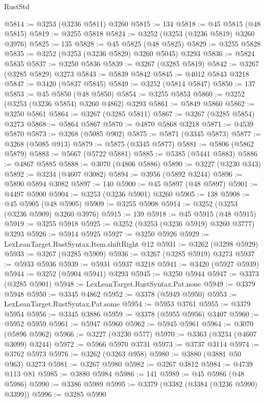 \begin{lexlean}{RustStd}
\begin{coremodule}
{\begin{coremodule}
{{{{{{{{{{{{{{{{{{{{{{{{{{{{{{{{{{{{{{{@5814 := @3253 (@3236 @5811) @3260
@5815 := 134
@5818 := @45 @5815 (@48 @5815)
@5819 := @3255 @5818
@5824 := @3252 (@3253 (@3236 @5819) @3260 @3976)
@5825 := 135
@5828 := @45 @5825 (@48 @5825)
@5829 := @3255 @5828
@5835 := @3252 (@3253 (@3236 @5829) @3260 @5045) @3293
@5836 := @5824 @5835
@5837 := @3250 @5836
@5839 := @3267 (@3285 @5819)
@5842 := @3267 (@3285 @5829) @3273
@5843 := @5839 @5842
@5845 := @4012 @5843 @3218
@5847 := @3420 (@5837 @5845)
@5849 := @3252 (@5814 @5847)
@5850 := 137
@5853 := @45 @5850 (@48 @5850)
@5854 := @3255 @5853
@5860 := @3252 (@3253 (@3236 @5854) @3260 @4862) @3293
@5861 := @5849 @5860
@5862 := @3250 @5861
@5864 := @3267 (@3285 @5811)
@5867 := @3267 (@3285 @5854) @3273
@5868 := @5864 @5867
@5870 := @4870 @5868 @3218
@5871 := @4539 @5870
@5873 := @3268 (@5085 @902)
@5875 := @5871 (@3345 @5873)
@5877 := @3268 (@5085 @913)
@5879 := @5875 (@3345 @5877)
@5881 := @5806 (@5862 @5879)
@5883 := @5667 (@5722 @5881)
@5885 := @5385 (@5441 @5883)
@5886 := @4867 @5885
@5888 := @3070 (@4806 @5886)
@5890 := @3227 (@3230 @343)
@5892 := @3234 (@4607 @3082)
@5894 := @3956 (@5892 @3244)
@5896 := @5890 @5894 @3082
@5897 := 140
@5900 := @45 @5897 (@48 @5897)
@5901 := @4497 @5900
@5904 := @3253 (@3236 @5901) @3260
@5905 := 138
@5908 := @45 @5905 (@48 @5905)
@5909 := @3255 @5908
@5914 := @3252 (@3253 (@3236 @5909) @3260 @3976)
@5915 := 139
@5918 := @45 @5915 (@48 @5915)
@5919 := @3255 @5918
@5925 := @3252 (@3253 (@3236 @5919) @3260 @3777) @3293
@5926 := @5914 @5925
@5927 := @3250 @5926
@5929 := LexLeanTarget.RustSyntax.Item.shiftRight @12
@5931 := @3262 (@3298 @5929)
@5933 := @3267 (@3285 @5909)
@5936 := @3267 (@3285 @5919) @3273
@5937 := @5933 @5936
@5939 := @5931 @5937 @3218
@5941 := @3420 (@5927 @5939)
@5944 := @3252 (@5904 @5941) @3293
@5945 := @3250 @5944
@5947 := @3373 (@3285 @5901)
@5948 := LexLeanTarget.RustSyntax.Pat.none
@5949 := @3379 @5948
@5950 := @3345 @4862
@5952 := @3378 (@5949 @5950)
@5953 := LexLeanTarget.RustSyntax.Pat.some
@5954 := @5953 @3761
@5955 := @3379 @5954
@5956 := @3345 @3886
@5959 := @3378 (@5955 @5956) @3407
@5960 := @5952 @5959
@5961 := @5947 @5960
@5962 := @5945 @5961
@5964 := @3070 (@5896 @5962)
@5966 := @3227 (@3230 @577)
@5970 := @3363 (@3234 (@4607 @3099) @3244)
@5972 := @5966 @5970 @3731
@5973 := @3737 @3114
@5974 := @3762 @5973
@5976 := @3262 (@3263 @958)
@5980 := @3880 (@3881 @50 @963) @3273
@5981 := @3267 @5980
@5982 := @3267 @3812
@5984 := @4739 @113 @81
@5985 := @3880 @5984
@5986 := 141
@5989 := @45 @5986 (@48 @5986)
@5990 := @3386 @5989
@5995 := @3379 (@3382 (@3384 (@3236 @5990) @3399))
@5996 := @3285 @5990
}}}}}}}}}}}}}}}}}}}}}}}}}}}}}}}}}}}}}}}
\end{coremodule}}
\end{coremodule}
\end{lexlean}
